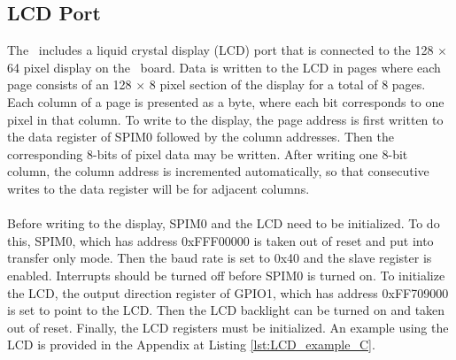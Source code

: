 \subsection{LCD Port}

The \systemName~includes a liquid crystal display (LCD) port that is connected to the 128 $\times$ 64 pixel display on the \DEBoard~board. Data is written to the LCD in pages where each page consists of an 128 $\times$ 8 pixel section of the display for a total of 8 pages. Each column of a page is presented as a byte, where each bit corresponds to one pixel in that column. To write to the display, the page address is first written to the data register of SPIM0 followed by the column addresses. Then the corresponding 8-bits of pixel data may be written. After writing one 8-bit column, the column address is incremented automatically, so that consecutive writes to the data register will be for adjacent columns. \\
~\\
Before writing to the display, SPIM0 and the LCD need to be initialized. To do this, SPIM0, which has address {\sf 0xFFF00000} is taken out of reset and put into transfer only mode. Then the baud rate is set to 0x40 and the slave register is enabled. Interrupts should be turned off before SPIM0 is turned on. To initialize the LCD, the output direction register of GPIO1, which has address {\sf 0xFF709000} is set to point to the LCD. Then the LCD backlight can be turned on and taken out of reset. Finally, the LCD registers must be initialized.
An example using the LCD is provided in the Appendix at Listing \ref{lst:LCD_example_C}.